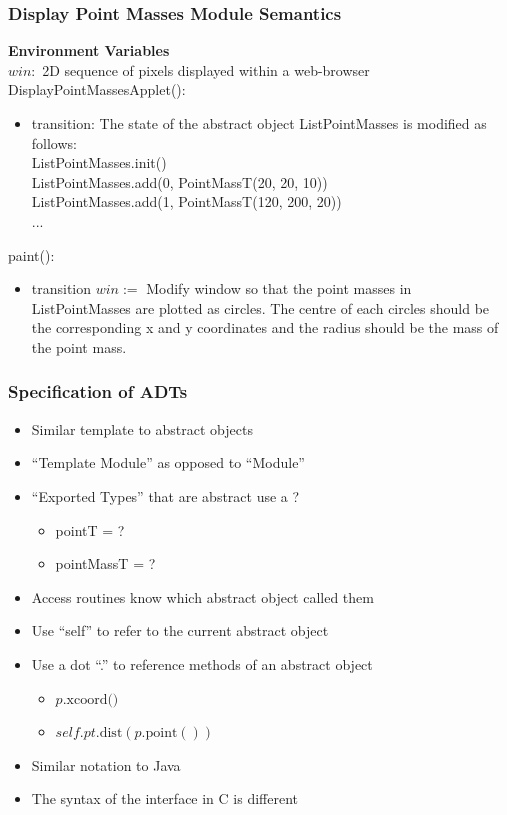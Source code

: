 \documentclass[t,12pt,numbers,fleqn]{beamer}
\begin{document}
\begin{frame}
\frametitle{Display Point Masses Module Semantics}

\textbf{Environment Variables}\\
$\mathit{win}:$ 2D sequence of pixels displayed within a web-browser \\

\noindent DisplayPointMassesApplet():
\begin{itemize}
\item transition: The state of the abstract object ListPointMasses is modified as follows:\\
ListPointMasses.init()\\
ListPointMasses.add(0, PointMassT(20, 20, 10))\\
ListPointMasses.add(1, PointMassT(120, 200, 20))\\
...
\end{itemize}

\noindent paint():
\begin{itemize}
\item transition $win := $ Modify window so that the point masses in ListPointMasses 
are plotted as circles.  The centre of each circles should be the corresponding x and y coordinates and the radius should
be the mass of the point mass.
\end{itemize}

\end{frame}


\begin{frame}
\frametitle{Specification of ADTs}
\begin{itemize}
\item Similar template to abstract objects
\item ``Template Module'' as opposed to ``Module''
\item ``Exported Types'' that are abstract use a ?
\begin{itemize}
\item pointT = ?
\item pointMassT = ?
\end{itemize}
\item Access routines know which abstract object called them
\item Use ``self'' to refer to the current abstract object
\item Use a dot ``.'' to reference methods of an abstract object
\begin{itemize}
\item $p.\mbox{xcoord()}$
\item $\mathit{self}.pt.\mbox{dist}(p.\mbox{point}())$
\end{itemize}
\item Similar notation to Java
\item The syntax of the interface in C is different
\end{itemize}
\end{frame}
\end{document}
